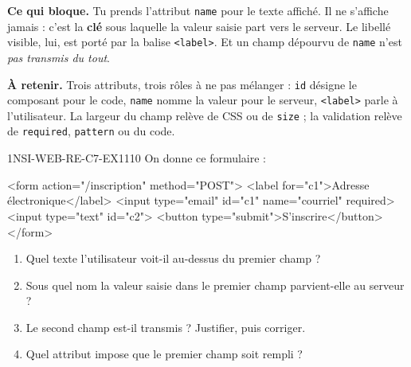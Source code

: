 

\textbf{Ce qui bloque.} Tu prends l'attribut \lstinline{name} pour le texte affiché. Il ne
s'affiche jamais : c'est la \textbf{clé} sous laquelle la valeur saisie part vers le serveur.
Le libellé visible, lui, est porté par la balise \lstinline{<label>}. Et un champ dépourvu de
\lstinline{name} n'est \emph{pas transmis du tout}.

\textbf{À retenir.} Trois attributs, trois rôles à ne pas mélanger : \lstinline{id} désigne le
composant pour le code, \lstinline{name} nomme la valeur pour le serveur, \lstinline{<label>}
parle à l'utilisateur. La largeur du champ relève de CSS ou de \lstinline{size} ; la validation
relève de \lstinline{required}, \lstinline{pattern} ou du code.

\begin{exercice}{1NSI-WEB-RE-C7-EX1}{1}{10}
On donne ce formulaire :
\begin{console}
<form action="/inscription" method="POST">
    <label for="c1">Adresse électronique</label>
    <input type="email" id="c1" name="courriel" required>
    <input type="text" id="c2">
    <button type="submit">S'inscrire</button>
</form>
\end{console}
\begin{enumerate}
  \item Quel texte l'utilisateur voit-il au-dessus du premier champ ?
  \item Sous quel nom la valeur saisie dans le premier champ parvient-elle au serveur ?
  \item Le second champ est-il transmis ? Justifier, puis corriger.
  \item Quel attribut impose que le premier champ soit rempli ?
\end{enumerate}
\end{exercice}
